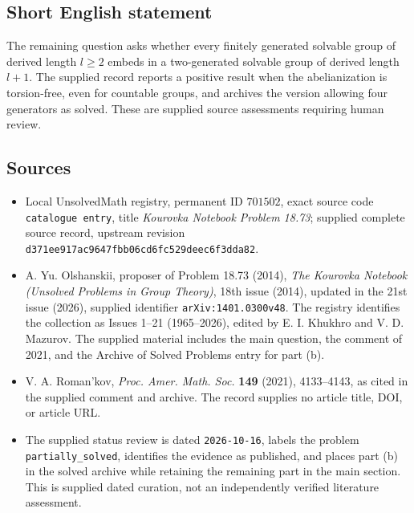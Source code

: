 \documentclass[11pt]{article}
\begin{document}
\subsection{Short English statement}
The remaining question asks whether every finitely generated solvable group of derived length \(l\geq 2\) embeds in a two-generated solvable group of derived length \(l+1\). The supplied record reports a positive result when the abelianization is torsion-free, even for countable groups, and archives the version allowing four generators as solved. These are supplied source assessments requiring human review.
\subsection{Sources}
\begin{itemize}
\item Local UnsolvedMath registry, permanent ID \(701502\), exact source code \texttt{catalogue entry}, title \emph{Kourovka Notebook Problem 18.73}; supplied complete source record, upstream revision \texttt{d371ee917ac9647fbb06cd6fc529deec6f3dda82}.
\item A. Yu. Olshanskii, proposer of Problem 18.73 (2014), \emph{The Kourovka Notebook (Unsolved Problems in Group Theory)}, 18th issue (2014), updated in the 21st issue (2026), supplied identifier \texttt{arXiv:1401.0300v48}. The registry identifies the collection as Issues 1--21 (1965--2026), edited by E. I. Khukhro and V. D. Mazurov. The supplied material includes the main question, the comment of 2021, and the Archive of Solved Problems entry for part (b).
\item V. A. Roman'kov, \emph{Proc. Amer. Math. Soc.} \textbf{149} (2021), 4133--4143, as cited in the supplied comment and archive. The record supplies no article title, DOI, or article URL.
\item The supplied status review is dated \texttt{2026-10-16}, labels the problem \texttt{partially\_solved}, identifies the evidence as published, and places part (b) in the solved archive while retaining the remaining part in the main section. This is supplied dated curation, not an independently verified literature assessment.
\end{itemize}
\end{document}
